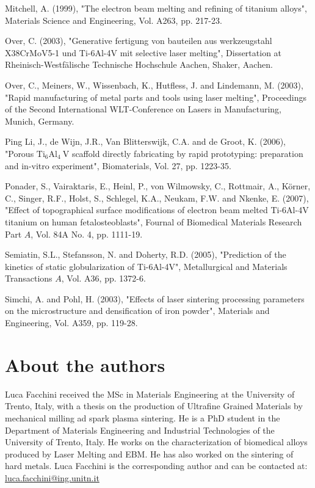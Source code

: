 \documentclass[10pt]{article}
\begin{document}
Mitchell, A. (1999), "The electron beam melting and refining of titanium alloys", Materials Science and Engineering, Vol. A263, pp. 217-23.

Over, C. (2003), "Generative fertigung von bauteilen aus werkzeugstahl X38CrMoV5-1 und Ti-6Al-4V mit selective laser melting", Dissertation at Rheinisch-Westfälische Technische Hochschule Aachen, Shaker, Aachen.

Over, C., Meiners, W., Wissenbach, K., Hutfless, J. and Lindemann, M. (2003), "Rapid manufacturing of metal parts and tools using laser melting", Proceedings of the Second International WLT-Conference on Lasers in Manufacturing, Munich, Germany.

Ping Li, J., de Wijn, J.R., Van Blitterswijk, C.A. and de Groot, K. (2006), "Porous $\mathrm{Ti}_{6} \mathrm{Al}_{4} \mathrm{~V}$ scaffold directly fabricating by rapid prototyping: preparation and in-vitro experiment", Biomaterials, Vol. 27, pp. 1223-35.

Ponader, S., Vairaktaris, E., Heinl, P., von Wilmowsky, C., Rottmair, A., Körner, C., Singer, R.F., Holst, S., Schlegel, K.A., Neukam, F.W. and Nkenke, E. (2007), "Effect of topographical surface modifications of electron beam melted Ti-6Al-4V titanium on human fetalosteoblasts", Fournal of Biomedical Materials Research Part $A$, Vol. 84A No. 4, pp. 1111-19.

Semiatin, S.L., Stefansson, N. and Doherty, R.D. (2005), "Prediction of the kinetics of static globularization of Ti-6Al-4V", Metallurgical and Materials Transactions $A$, Vol. A36, pp. 1372-6.

Simchi, A. and Pohl, H. (2003), "Effects of laser sintering processing parameters on the microstructure and densification of iron powder", Materials and Engineering, Vol. A359, pp. 119-28.

\section*{About the authors}
Luca Facchini received the MSc in Materials Engineering at the University of Trento, Italy, with a thesis on the production of Ultrafine Grained Materials by mechanical milling ad spark plasma sintering. He is a PhD student in the Department of Materials Engineering and Industrial Technologies of the University of Trento, Italy. He works on the characterization of biomedical alloys produced by Laser Melting and EBM. $\mathrm{He}$ has also worked on the sintering of hard metals. Luca Facchini is the corresponding author and can be contacted at: \href{mailto:luca.facchini@ing.unitn.it}{luca.facchini@ing.unitn.it}
\end{document}
